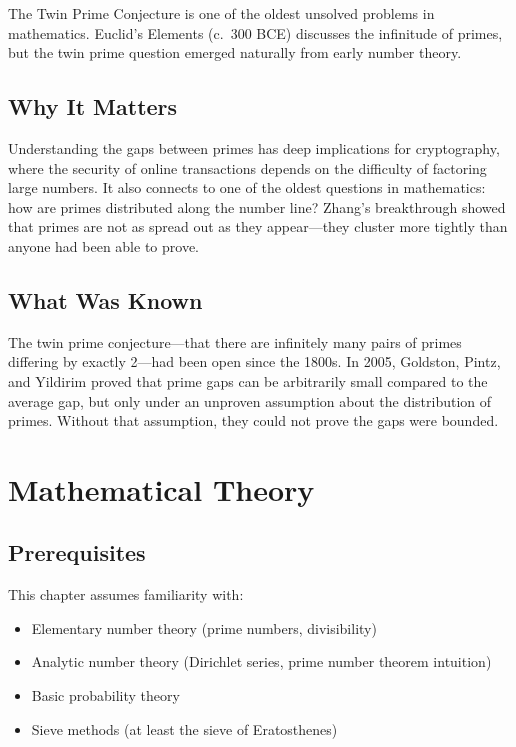 \begin{historicalbox}
The Twin Prime Conjecture is one of the oldest unsolved problems in mathematics. Euclid's Elements (c.\ 300 BCE) discusses the infinitude of primes, but the twin prime question emerged naturally from early number theory.
\end{historicalbox}

\subsection{Why It Matters}
Understanding the gaps between primes has deep implications for cryptography, where the security of online transactions depends on the difficulty of factoring large numbers. It also connects to one of the oldest questions in mathematics: how are primes distributed along the number line? Zhang's breakthrough showed that primes are not as spread out as they appear---they cluster more tightly than anyone had been able to prove.

\subsection{What Was Known}
The twin prime conjecture---that there are infinitely many pairs of primes differing by exactly 2---had been open since the 1800s. In 2005, Goldston, Pintz, and Yildirim proved that prime gaps can be arbitrarily small compared to the average gap, but only under an unproven assumption about the distribution of primes. Without that assumption, they could not prove the gaps were bounded.

\section{Mathematical Theory}


\subsection{Prerequisites}
This chapter assumes familiarity with:
\begin{itemize}
\item Elementary number theory (prime numbers, divisibility)
\item Analytic number theory (Dirichlet series, prime number theorem intuition)
\item Basic probability theory
\item Sieve methods (at least the sieve of Eratosthenes)
\end{itemize}

